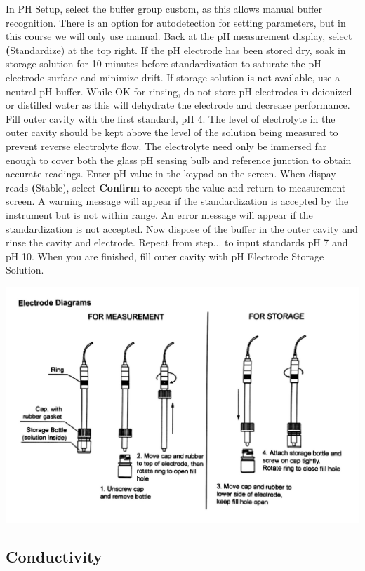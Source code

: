 \documentclass[12pt]{../SOP3_beta}\usepackage[]{graphicx}\usepackage[]{color}
\begin{document}
\NP In PH Setup, select the buffer group custom, as this allows manual buffer recognition. There is an option for autodetection for setting parameters, but in this course we will only use manual.
\NP Back at the pH measurement display, select \textbf(Standardize) at the top right.
\NP If the pH electrode has been stored dry, soak in storage solution for 10 minutes before standardization to saturate the pH electrode surface and minimize drift. If storage solution is not available, use a neutral pH buffer. While OK for rinsing, do not store pH electrodes in deionized or distilled water as this will dehydrate the electrode and decrease performance. 
\NP Fill outer cavity with the first standard, pH 4. The level of electrolyte in the outer cavity should be kept above the level of the solution being measured to prevent reverse electrolyte flow. The electrolyte need only be immersed far enough to cover both the glass pH sensing bulb and reference junction to obtain accurate readings.
\NP Enter pH value in the keypad on the screen.
\NP When dispay reads \textbf(Stable), select \textbf{Confirm} to accept the value and return to measurement screen. A warning message will appear if the standardization is accepted by the instrument but is not within range. An error message will appear if the standardization is not accepted.
\NP Now dispose of the buffer in the outer cavity and rinse the cavity and electrode. Repeat from step... to input standards pH 7 and pH 10.
\NP When you are finished, fill outer cavity with pH Electrode Storage Solution.

\NP\includegraphics[scale=.25]{Electrode.png}

\subsection{Conductivity}
\end{document}
